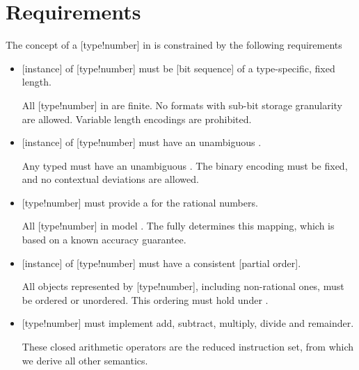 \section{Requirements}

The concept of a [type!number] in \basetwo is constrained by the following requirements

\begin{itemize}
    \item[\Require{req:bits}] [instance] of [type!number] must be [bit sequence] of a type-specific, fixed length.

    \begin{highlight}{}
        All [type!number] in \basetwo are finite.
        No formats with sub-bit storage granularity are allowed.
        Variable length encodings are prohibited.
    \end{highlight}

    \item[\Require{req:interpretation}] [instance] of [type!number] must have an unambiguous .

    \begin{highlight}{}
        Any typed  must have an unambiguous .
        The binary encoding must be fixed, and no contextual deviations are allowed.
    \end{highlight}

    \item[\Require{req:representation}] [type!number] must provide a  for the rational numbers.

    \begin{highlight}{}
        All [type!number] in \basetwo model \Rat{}.
        The  fully determines this mapping, which is based on a known accuracy guarantee.
    \end{highlight}

    \item[\Require{req:ordering}] [instance] of [type!number] must have a consistent [partial order].

    \begin{highlight}{}
        All objects represented by [type!number], including non-rational ones, must be ordered or unordered.
        This ordering must hold under .
    \end{highlight}

    \item[\Require{req:closed_arithmetic}] [type!number] must implement add, subtract, multiply, divide and remainder.

    \begin{highlight}{}
        These closed arithmetic operators are the reduced instruction set, from which we derive all other semantics.
    \end{highlight}
\end{itemize}

